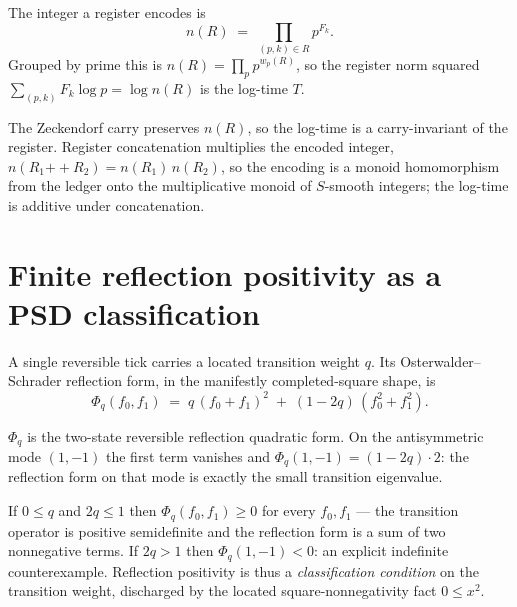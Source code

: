 \begin{definition}
\label{def:oclsd-register-encoded-integer}
The integer a register encodes is
$$
n(R) \;=\; \prod_{(p,k)\in R} p^{F_k}.
$$
Grouped by prime this is $n(R)=\prod_p p^{w_p(R)}$, so the register norm squared
$\sum_{(p,k)} F_k\log p=\log n(R)$ is the log-time $T$.
\end{definition}

\begin{theorem}
\label{thm:oclsd-register-ledger-monoid}
The Zeckendorf carry preserves $n(R)$, so the log-time is a carry-invariant of the
register. Register concatenation multiplies the encoded integer,
$n(R_1 \mathbin{+\!\!+} R_2)=n(R_1)\,n(R_2)$, so the encoding is a monoid homomorphism
from the ledger onto the multiplicative monoid of $S$-smooth integers; the log-time
is additive under concatenation.
\end{theorem}

\section{Finite reflection positivity as a PSD classification}

A single reversible tick carries a located transition weight $q$. Its
Osterwalder--Schrader reflection form, in the manifestly completed-square shape, is
$$
\Phi_q(f_0,f_1) \;=\; q\,(f_0+f_1)^2 \;+\; (1-2q)\,(f_0^2+f_1^2).
$$

\begin{definition}
\label{def:oclsd-reflection-form}
$\Phi_q$ is the two-state reversible reflection quadratic form. On the antisymmetric
mode $(1,-1)$ the first term vanishes and $\Phi_q(1,-1)=(1-2q)\cdot 2$: the reflection
form on that mode is exactly the small transition eigenvalue.
\end{definition}

\begin{theorem}
\label{thm:oclsd-reflection-psd}
If $0\le q$ and $2q\le 1$ then $\Phi_q(f_0,f_1)\ge 0$ for every $f_0,f_1$ --- the
transition operator is positive semidefinite and the reflection form is a sum of two
nonnegative terms. If $2q>1$ then $\Phi_q(1,-1)<0$: an explicit indefinite
counterexample. Reflection positivity is thus a \emph{classification condition} on the
transition weight, discharged by the located square-nonnegativity fact $0\le x^2$.
\end{theorem}

